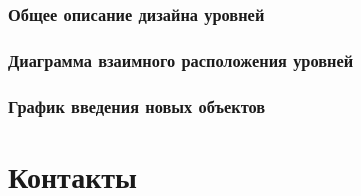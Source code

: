 \documentclass{article}
\begin{document}
\subsubsection{Общее описание дизайна уровней}
\subsubsection{Диаграмма взаимного расположения уровней}
\subsubsection{ График введения новых объектов}
\section{Контакты}


\end{document}
